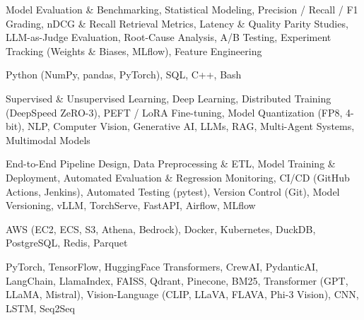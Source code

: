 \documentclass[letter,10pt]{article}
\begin{document}
 Model Evaluation \& Benchmarking, Statistical Modeling, Precision / Recall / F1 Grading, nDCG \& Recall Retrieval Metrics, Latency \& Quality Parity Studies, LLM-as-Judge Evaluation, Root-Cause Analysis, A/B Testing, Experiment Tracking (Weights \& Biases, MLflow), Feature Engineering\par\vspace{2pt}

 Python (NumPy, pandas, PyTorch), SQL, C++, Bash\par\vspace{2pt}

 Supervised \& Unsupervised Learning, Deep Learning, Distributed Training (DeepSpeed ZeRO-3), PEFT / LoRA Fine-tuning, Model Quantization (FP8, 4-bit), NLP, Computer Vision, Generative AI, LLMs, RAG, Multi-Agent Systems, Multimodal Models\par\vspace{2pt}

 End-to-End Pipeline Design, Data Preprocessing \& ETL, Model Training \& Deployment, Automated Evaluation \& Regression Monitoring, CI/CD (GitHub Actions, Jenkins), Automated Testing (pytest), Version Control (Git), Model Versioning, vLLM, TorchServe, FastAPI, Airflow, MLflow\par\vspace{2pt}

 AWS (EC2, ECS, S3, Athena, Bedrock), Docker, Kubernetes, DuckDB, PostgreSQL, Redis, Parquet\par\vspace{2pt}

 PyTorch, TensorFlow, HuggingFace Transformers, CrewAI, PydanticAI, LangChain, LlamaIndex, FAISS, Qdrant, Pinecone, BM25, Transformer (GPT, LLaMA, Mistral), Vision-Language (CLIP, LLaVA, FLAVA, Phi-3 Vision), CNN, LSTM, Seq2Seq
\end{document}
